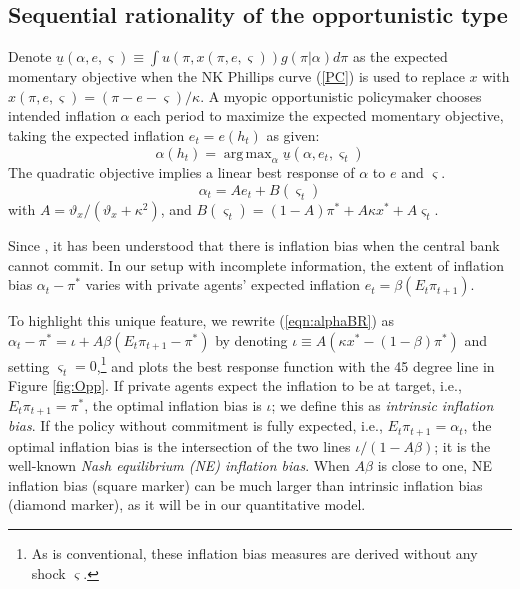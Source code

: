 \documentclass[12pt,letter,leqno]{article}
\theoremstyle{asn}
\theoremstyle{lem}
\theoremstyle{slem}
\theoremstyle{prop}
\theoremstyle{appprop}
\theoremstyle{rem}
\theoremstyle{defn}
\DeclareMathOperator*{\argmax}{arg\,max}
\begin{document}
\subsection{Sequential rationality of the opportunistic type}
\label{SR_opportunistic}

Denote $\underline{u}\left (\alpha ,e,\varsigma \right) \equiv \int u\left(\pi, x(\pi,e,\varsigma)\right) g\left( \pi
|\alpha\right) d\pi$ as the expected momentary objective when the NK Phillips curve (\ref{PC}) is used to replace $x$ with $x(\pi,e,\varsigma)=\left( \pi -e-\varsigma \right)/\kappa$.
A myopic opportunistic policymaker chooses intended inflation $\alpha$ each period to maximize the expected momentary objective, taking the expected inflation $e_t=e(h_t)$ as given:
\begin{equation}\label{IC}
    \alpha(h_t) = \argmax_{\alpha}\underline{u}(\alpha,e_t,\varsigma_t ) 
\end{equation}
The quadratic objective implies a linear best response of $\alpha$ to $e$ and $\varsigma$. 
\begin{equation}
\alpha _{t}=Ae_{t}+B(\varsigma _{t})  \label{eqn:alphaBR}
\end{equation}%
with $A=\vartheta_{x}/(\vartheta_{x}+\kappa^2)$, and $B(\varsigma_t
)=(1-A)\pi^{\ast }+A\kappa x^*+A\varsigma_{t}$. 

Since \cite{kydland_rules_1977}, it has been understood that there is inflation bias when the central bank cannot commit. In our setup with incomplete information, the extent of inflation bias $\alpha_t-\pi^*$ varies with private agents' expected inflation $e_t=\beta(E_t\pi_{t+1})$. 

To highlight this unique feature, we rewrite (\ref{eqn:alphaBR}) as $\alpha_t-\pi^*=\iota + A\beta(E_t\pi_{t+1}-\pi^{\ast })$ by denoting $\iota \equiv A(\kappa x^*-(1-\beta)\pi^*)$ and setting $\varsigma_t=0$,\footnote{As is conventional, these inflation bias measures are derived without any shock $\varsigma$.} and plots the best response function with the 45 degree line in Figure \ref{fig:Opp}. If private agents expect the inflation to be at target, i.e., $E_t\pi_{t+1}=\pi^*$, the optimal inflation bias is $\iota$; we define this as \textit{intrinsic inflation bias}. If the policy without commitment is fully expected, i.e., $E_t\pi_{t+1}=\alpha_t$, the optimal inflation bias is the intersection of the two lines $\iota/(1-A\beta)$; it is the well-known \textit{Nash equilibrium (NE) inflation bias}. When $A\beta$ is close to one, NE inflation bias (square marker) can be much larger than intrinsic inflation bias (diamond marker), as it will be in our quantitative model. 
\end{document}
